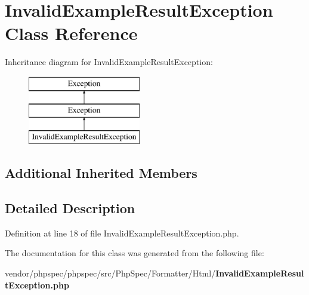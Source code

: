 \section{Invalid\+Example\+Result\+Exception Class Reference}
\label{class_php_spec_1_1_formatter_1_1_html_1_1_invalid_example_result_exception}
Inheritance diagram for Invalid\+Example\+Result\+Exception\+:\begin{figure}[H]
\begin{center}
\leavevmode
\includegraphics[height=3.000000cm]{class_php_spec_1_1_formatter_1_1_html_1_1_invalid_example_result_exception}
\end{center}
\end{figure}
\subsection*{Additional Inherited Members}


\subsection{Detailed Description}


Definition at line 18 of file Invalid\+Example\+Result\+Exception.\+php.



The documentation for this class was generated from the following file\+:\begin{DoxyCompactItemize}
\item 
vendor/phpspec/phpspec/src/\+Php\+Spec/\+Formatter/\+Html/{\bf Invalid\+Example\+Result\+Exception.\+php}\end{DoxyCompactItemize}
